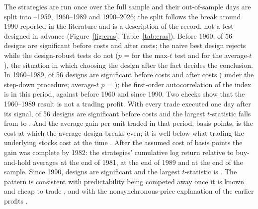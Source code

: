 \documentclass[pdflatex,sn-basic]{sn-jnl}
\theoremstyle{thmstyleone}
\theoremstyle{thmstylethree}
\begin{document}
\begin{appendices}
The strategies are run once over the full sample and their out-of-sample days are split into
\NumUSoosFirst--1959, 1960--1989 and 1990--2026; the split follows the break around 1990 reported in the
literature and is a description of the record, not a test designed in advance
(Figure~\ref{fig:eras}, Table~\ref{tab:eras}). Before 1960, \NumEraOneSig{} of 56 designs are
significant before costs and \NumEraOneNetSig{} after costs; the naive best design rejects while the
design-robust tests do not ($p$ = \NumEraOnePmax{} for the max-$t$ test and \NumEraOnePavg{} for the
average-$t$), the situation in which choosing the design after the fact decides the conclusion. In
1960--1989, \NumEraTwoSig{} of 56 designs are significant before costs and \NumEraTwoNetSig{} after costs
(\NumEraTwoNetStepm{} under the step-down procedure; average-$t$ $p$ = \NumEraTwoNetPavg); the
first-order autocorrelation of the index is \NumACtwo{} in this period, against \NumACone{} before 1960
and \NumACthree{} since 1990. Two checks show that the 1960--1989 result is not a trading profit. With
every trade executed one day after its signal, \NumEraTwoLagSig{} of 56 designs are significant before
costs and the largest $t$-statistic falls from \NumEraTwoMaxT{} to \NumEraTwoLagMaxT. And the average gain
per unit traded in that period, \NumEraTwoBreakeven{} basis points, is the cost at which the average
design breaks even; it is well below what trading the underlying stocks cost at the time
\citep{jones2002}. After the assumed cost of \NumCostBp{} basis points the gain was complete by 1982:
the strategies' cumulative log return relative to buy-and-hold averages \NumUSnetRelPreFutures{} at the
end of 1981, \NumUSnetRelEndEighties{} at the end of 1989 and \NumUSnetRelEnd{} at the end of the sample.
Since 1990, \NumEraThreeSig{} designs are significant and the largest $t$-statistic is
\NumEraThreeMaxT. The pattern is consistent with predictability being competed away once it is known and
cheap to trade \citep{lo2004,timmermann2004,mclean2016}, and with the nonsynchronous-price
explanation of the earlier profits \citep{day2002,ready2002}.

\end{appendices}


\end{document}
